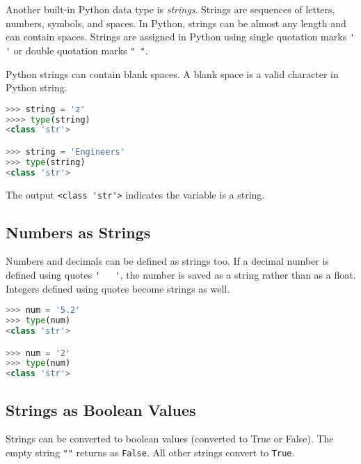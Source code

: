 \documentclass{book}
\newcommand{\passthrough}[1]{#1}
\begin{document}
    
        Another built-in Python data type is \emph{strings}. Strings are
sequences of letters, numbers, symbols, and spaces. In Python, strings
can be almost any length and can contain spaces. Strings are assigned in
Python using single quotation marks \passthrough{\lstinline!'   '!} or
double quotation marks \passthrough{\lstinline!" "!}.

Python strings can contain blank spaces. A blank space is a valid
character in Python string.

\begin{lstlisting}[language=Python]
>>> string = 'z'
>>>> type(string)
<class 'str'>

>>> string = 'Engineers'
>>> type(string)
<class 'str'>
\end{lstlisting}

The output \passthrough{\lstinline!<class 'str'>!} indicates the
variable is a string.
    




    
        \hypertarget{numbers-as-strings}{%
\subsection{Numbers as Strings}\label{numbers-as-strings}}

Numbers and decimals can be defined as strings too. If a decimal number
is defined using quotes \passthrough{\lstinline!'   '!}, the number is
saved as a string rather than as a float. Integers defined using quotes
become strings as well.

\begin{lstlisting}[language=Python]
>>> num = '5.2'
>>> type(num)
<class 'str'>

>>> num = '2'
>>> type(num)
<class 'str'>
\end{lstlisting}
    




    
        \hypertarget{strings-as-boolean-values}{%
\subsection{Strings as Boolean Values}\label{strings-as-boolean-values}}

Strings can be converted to boolean values (converted to True or False).
The empty string \passthrough{\lstinline!""!} returns as
\passthrough{\lstinline!False!}. All other strings convert to
\passthrough{\lstinline!True!}.
\end{document}
